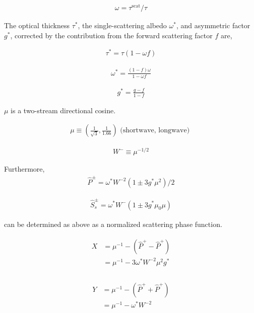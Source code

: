 \begin{eqnarray}
\omega=\tau^{\text{scat}}/\tau
\end{eqnarray}

The optical thickness \(\tau^{*}\), the single-scattering albedo \(\omega^{*}\), and asymmetric factor \(g^{*}\), corrected by the contribution from the forward scattering factor \(f\) are,

\begin{eqnarray}
\tau^{*}=\tau(1-\omega f)
\end{eqnarray}

\begin{eqnarray}
\omega^{*}=\frac{(1-f) \omega}{1-\omega f}
\end{eqnarray}

\begin{eqnarray}
g^{*}=\frac{g-f}{1-f}
\end{eqnarray}

\(\mu\) is a two-stream directional cosine.

\begin{eqnarray}
\mu \equiv\left(\frac{1}{\sqrt{3}}, \frac{1}{1.66}\right) \text { (shortwave, longwave) }
\end{eqnarray}

\begin{eqnarray}
W^{-} \equiv \mu^{-1 / 2}
\end{eqnarray}

Furthermore, \begin{eqnarray}
\hat{P}^{\pm}=\omega^{*} W^{-2}\left(1 \pm 3 g^{*} \mu^{2}\right) / 2
\end{eqnarray}

\begin{eqnarray}
\hat{S}_{s}^{\pm}=\omega^{*} W^{-}\left(1 \pm 3 g^{*} \mu_{0} \mu\right)
\end{eqnarray}

can be determined as above as a normalized scattering phase function.

\begin{eqnarray}
\begin{aligned}
X &=\mu^{-1}-\left(\hat{P}^{+}-\hat{P}^{+}\right) \\
&=\mu^{-1}-3 \omega^{*} W^{-2} \mu^{2} g^{*} \\
\end{aligned}
\end{eqnarray}

\begin{eqnarray}
\begin{aligned}
Y &=\mu^{-1}-\left(\hat{P}^{+}+\hat{P}^{+}\right) \\
&=\mu^{-1}-\omega^{*} W^{-2} \\
\end{aligned}
\end{eqnarray}

